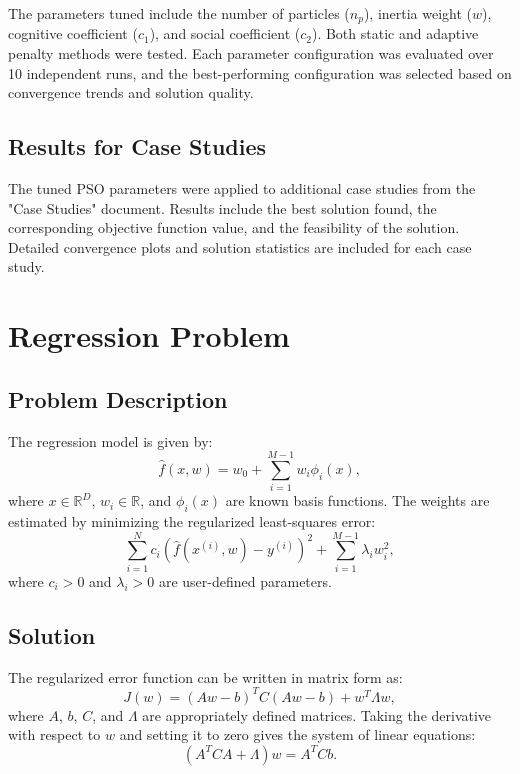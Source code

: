 \documentclass[12pt]{article}
\begin{document}
The parameters tuned include the number of particles ($n_p$), inertia weight ($w$), cognitive coefficient ($c_1$), and social coefficient ($c_2$). Both static and adaptive penalty methods were tested. Each parameter configuration was evaluated over 10 independent runs, and the best-performing configuration was selected based on convergence trends and solution quality.

\subsection{Results for Case Studies}
The tuned PSO parameters were applied to additional case studies from the "Case Studies" document. Results include the best solution found, the corresponding objective function value, and the feasibility of the solution. Detailed convergence plots and solution statistics are included for each case study.

\section{Regression Problem}

\subsection{Problem Description}
The regression model is given by:
\begin{equation*}
    \hat{f}(x, w) = w_0 + \sum_{i=1}^{M-1} w_i \phi_i(x),
\end{equation*}
where $x \in \mathbb{R}^D$, $w_i \in \mathbb{R}$, and $\phi_i(x)$ are known basis functions. The weights are estimated by minimizing the regularized least-squares error:
\begin{equation*}
    \sum_{i=1}^{N} c_i (\hat{f}(x^{(i)}, w) - y^{(i)})^2 + \sum_{i=1}^{M-1} \lambda_i w_i^2,
\end{equation*}
where $c_i > 0$ and $\lambda_i > 0$ are user-defined parameters.

\subsection{Solution}
The regularized error function can be written in matrix form as:
\begin{equation*}
    J(w) = (Aw - b)^T C (Aw - b) + w^T \Lambda w,
\end{equation*}
where $A$, $b$, $C$, and $\Lambda$ are appropriately defined matrices. Taking the derivative with respect to $w$ and setting it to zero gives the system of linear equations:
\begin{equation*}
    (A^T C A + \Lambda) w = A^T C b.
\end{equation*}
\end{document}
